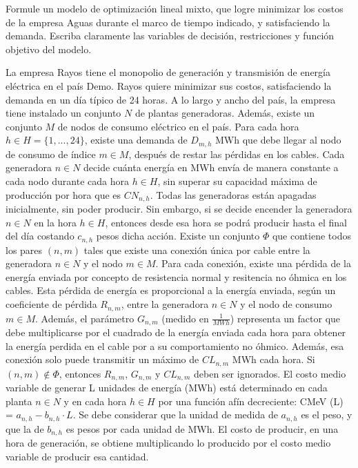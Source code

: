 \documentclass[addpoints,10pt]{exam}
\begin{document}
\begin{questions}
Formule un modelo de optimización lineal mixto, que logre minimizar los costos de la empresa Aguas durante el marco de tiempo indicado, y  satisfaciendo la demanda. Escriba claramente las variables de decisión, restricciones y función objetivo del modelo.\\






    \question[20]

La empresa Rayos tiene el monopolio de generación y transmisión de energía eléctrica en el país Demo. Rayos quiere minimizar sus costos, satisfaciendo la demanda en un día típico de 24 horas. A lo largo y ancho del país, la empresa tiene instalado un conjunto $N$ de plantas generadoras. Además, existe un conjunto $M$ de nodos de consumo eléctrico en el país. Para cada hora $h\in H= \{1,...,24\}$, existe una demanda de $D_{m,h}$ MWh que debe llegar al nodo de consumo de índice $m \in M$,  después de restar las pérdidas en los cables. Cada generadora $n \in N$ decide cuánta energía en MWh envía de manera constante a cada nodo durante cada hora $h \in H$, sin superar su capacidad máxima de producción por hora que es $CN_{n,h}$. Todas las generadoras están apagadas inicialmente, sin poder producir. Sin embargo, si se decide encender la generadora $n \in N$ en la hora $h \in H$, entonces desde esa hora se podrá producir hasta el final del día costando $c_{n,h}$ pesos dicha acción. Existe un conjunto $\Phi$ que contiene todos los pares $(n,m)$ tales que existe una conexión única por cable entre la generadora $n \in N$ y el nodo $m \in M$. Para cada conexión, existe una pérdida de la energía enviada por concepto de resistencia normal y resitencia no óhmica en los cables. Esta pérdida de energía es proporcional a la energía enviada, según un coeficiente de pérdida $R_{n,m}$, entre la generadora $n \in N$ y el nodo de consumo $m \in M$. Además, el  parámetro $G_{n,m}$ (medido en $\frac{1}{MWh}$) representa un factor que debe multiplicarse por el cuadrado de la energía enviada cada hora para obtener la energía perdida en el cable por a su comportamiento no óhmico. Además, esa conexión solo puede transmitir un máximo de $CL_{n,m}$ MWh cada hora. Si $(n,m) \notin \Phi$, entonces $R_{n,m}$, $G_{n,m}$  y $CL_{n,m}$ deben ser ignorados. El costo medio variable de generar L unidades de energía (MWh) está determinado en cada planta $n \in N$  y en cada hora $h \in H$ por una función afín decreciente: CMeV (L) = $a_{n,h} - b_{n,h}\cdot L$. Se debe considerar que la unidad de medida de $a_{n,h}$ es el peso, y que la de $b_{n,h}$ es pesos por cada unidad de MWh. El costo  de producir, en una hora de generación, se obtiene multiplicando lo producido por el costo medio variable de producir esa cantidad.


\end{questions}
\end{document}
